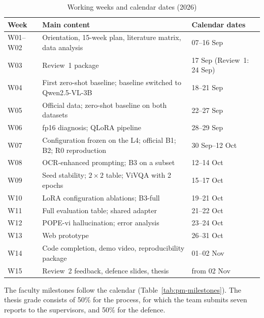 \begin{table}[htbp]
\caption{Working weeks and calendar dates (2026)}
\label{tab:pm-weeks}
\centering
\small
\begin{tabular}{p{}p{}p{}}
\toprule
\textbf{Week} & \textbf{Main content} & \textbf{Calendar dates} \\
\midrule
W01--W02 & Orientation, 15-week plan, literature matrix, data analysis & 07--16 Sep \\
W03 & Review~1 package & 17 Sep (Review~1: 24 Sep) \\
W04 & First zero-shot baseline; baseline switched to Qwen2.5-VL-3B & 18--21 Sep \\
W05 & Official data; zero-shot baseline on both datasets & 22--27 Sep \\
W06 & fp16 diagnosis; QLoRA pipeline & 28--29 Sep \\
W07 & Configuration frozen on the L4; official B1; B2; R0 reproduction & 30 Sep--12 Oct \\
W08 & OCR-enhanced prompting; B3 on a subset & 12--14 Oct \\
W09 & Seed stability; $2\times2$ table; ViVQA with 2 epochs & 15--17 Oct \\
W10 & LoRA configuration ablations; B3-full & 19--21 Oct \\
W11 & Full evaluation table; shared adapter & 21--22 Oct \\
W12 & POPE-vi hallucination; error analysis & 23--24 Oct \\
W13 & Web prototype & 26--31 Oct \\
W14 & Code completion, demo video, reproducibility package & 01--02 Nov \\
W15 & Review~2 feedback, defence slides, thesis & from 02 Nov \\
\bottomrule
\end{tabular}
\end{table}

The faculty milestones follow the calendar (Table~\ref{tab:pm-milestones}). The
thesis grade consists of 50\% for the process, for which the team submits seven
reports to the supervisors, and 50\% for the defence.

